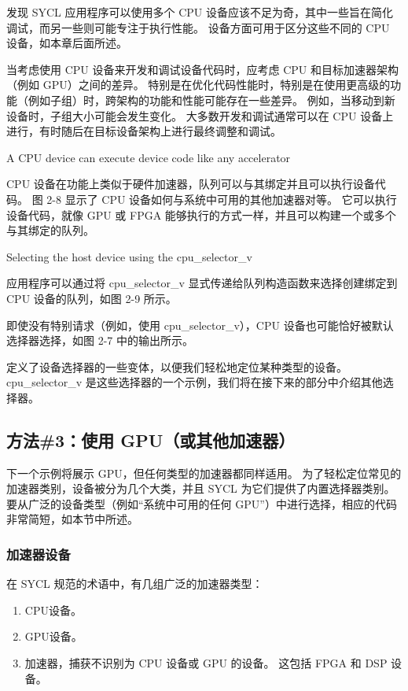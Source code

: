 发现 SYCL 应用程序可以使用多个 CPU 设备应该不足为奇，其中一些旨在简化调试，而另一些则可能专注于执行性能。 
设备方面可用于区分这些不同的 CPU 设备，如本章后面所述。

当考虑使用 CPU 设备来开发和调试设备代码时，应考虑 CPU 和目标加速器架构（例如 GPU）之间的差异。 
特别是在优化代码性能时，特别是在使用更高级的功能（例如子组）时，跨架构的功能和性能可能存在一些差异。 
例如，当移动到新设备时，子组大小可能会发生变化。 
大多数开发和调试通常可以在 CPU 设备上进行，有时随后在目标设备架构上进行最终调整和调试。

{\color{red} A CPU device can execute device code like any accelerator }

CPU 设备在功能上类似于硬件加速器，队列可以与其绑定并且可以执行设备代码。 
图 2-8 显示了 CPU 设备如何与系统中可用的其他加速器对等。 
它可以执行设备代码，就像 GPU 或 FPGA 能够执行的方式一样，并且可以构建一个或多个与其绑定的队列。

{\color{red} Selecting the host device using the cpu\_selector\_v }

应用程序可以通过将 cpu\_selector\_v 显式传递给队列构造函数来选择创建绑定到 CPU 设备的队列，如图 2-9 所示。

即使没有特别请求（例如，使用 cpu\_selector\_v），CPU 设备也可能恰好被默认选择器选择，如图 2-7 中的输出所示。

定义了设备选择器的一些变体，以便我们轻松地定位某种类型的设备。 
cpu\_selector\_v 是这些选择器的一个示例，我们将在接下来的部分中介绍其他选择器。

\subsection{方法\#3：使用 GPU（或其他加速器）}
下一个示例将展示 GPU，但任何类型的加速器都同样适用。 
为了轻松定位常见的加速器类别，设备被分为几个大类，并且 SYCL 为它们提供了内置选择器类别。 
要从广泛的设备类型（例如“系统中可用的任何 GPU”）中进行选择，相应的代码非常简短，如本节中所述。

\subsubsection{加速器设备}
在 SYCL 规范的术语中，有几组广泛的加速器类型：

\begin{enumerate}
	\item CPU设备。

	\item GPU设备。

	\item 加速器，捕获不识别为 CPU 设备或 GPU 的设备。 这包括 FPGA 和 DSP 设备。
\end{enumerate}

